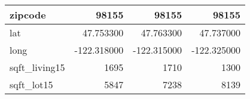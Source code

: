 \begin{table}[H]
\begin{tabular}{|l|r|r|r|}
\hline zipcode & \cellcolor[rgb]{0.9, 0.54, 0.52} 98155 & \cellcolor[rgb]{0.9, 0.54, 0.52} 98155 & \cellcolor[rgb]{0.9, 0.54, 0.52} 98155 \\
\hline lat & \cellcolor[rgb]{0.9, 0.54, 0.52} 47.753300 & 47.763300 & 47.737000 \\
\hline long & \cellcolor[rgb]{0.9, 0.54, 0.52} -122.318000 & \cellcolor[rgb]{0.9, 0.54, 0.52} -122.315000 & \cellcolor[rgb]{0.9, 0.54, 0.52} -122.325000 \\
\hline sqft\_living15 & \cellcolor[rgb]{0.9, 0.54, 0.52} 1695 & 1710 & 1300 \\
\hline sqft\_lot15 & \cellcolor[rgb]{0.9, 0.54, 0.52} 5847 & 7238 & 8139 \\
\hline
\end{tabular}
\end{table}
